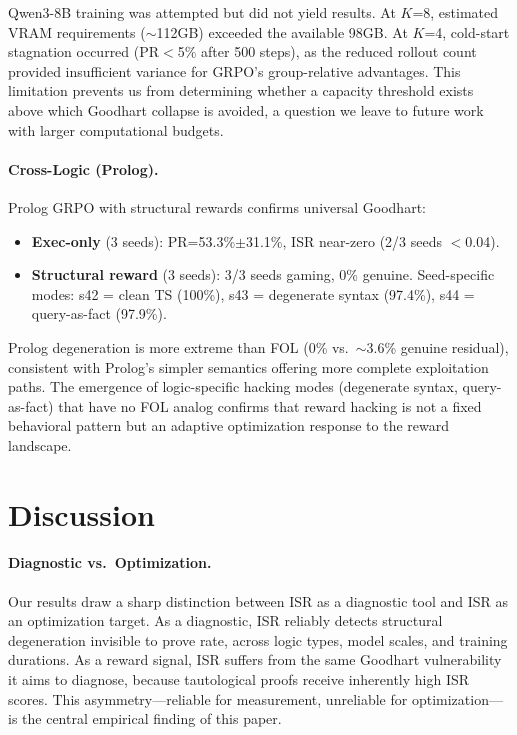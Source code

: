 \documentclass[11pt,a4paper]{article}
\newcommand{\isr}{\textsc{ISR}}
\newcommand{\pr}{\textsc{PR}}
\newcommand{\grpo}{\textsc{GRPO}}
\begin{document}
Qwen3-8B training was attempted but did not yield results.
At $K$=8, estimated VRAM requirements ($\sim$112GB) exceeded the available 98GB.
At $K$=4, cold-start stagnation occurred (\pr{}$<$5\% after 500 steps), as the reduced rollout count provided insufficient variance for \grpo{}'s group-relative advantages.
This limitation prevents us from determining whether a capacity threshold exists above which Goodhart collapse is avoided, a question we leave to future work with larger computational budgets.

\paragraph{Cross-Logic (Prolog).}
Prolog \grpo{} with structural rewards confirms universal Goodhart:
\begin{itemize}[leftmargin=*, itemsep=1pt]
\item \textbf{Exec-only} (3 seeds): \pr{}=53.3\%$\pm$31.1\%, \isr{} near-zero (2/3 seeds $<$0.04).
\item \textbf{Structural reward} (3 seeds): 3/3 seeds gaming, 0\% genuine.
  Seed-specific modes: s42 = clean TS (100\%), s43 = degenerate syntax (97.4\%), s44 = query-as-fact (97.9\%).
\end{itemize}

Prolog degeneration is more extreme than FOL (0\% vs.\ $\sim$3.6\% genuine residual), consistent with Prolog's simpler semantics offering more complete exploitation paths.
The emergence of logic-specific hacking modes (degenerate syntax, query-as-fact) that have no FOL analog confirms that reward hacking is not a fixed behavioral pattern but an adaptive optimization response to the reward landscape.

\section{Discussion}

\paragraph{Diagnostic vs.\ Optimization.}
Our results draw a sharp distinction between \isr{} as a diagnostic tool and \isr{} as an optimization target.
As a diagnostic, \isr{} reliably detects structural degeneration invisible to prove rate, across logic types, model scales, and training durations.
As a reward signal, \isr{} suffers from the same Goodhart vulnerability it aims to diagnose, because tautological proofs receive inherently high \isr{} scores.
This asymmetry---reliable for measurement, unreliable for optimization---is the central empirical finding of this paper.
\end{document}
